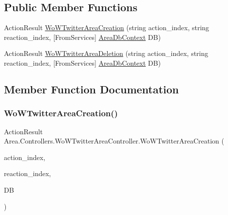 \subsection*{Public Member Functions}
\begin{DoxyCompactItemize}
\item 
Action\+Result \mbox{\hyperlink{classArea_1_1Controllers_1_1WoWTwitterAreaController_a5830d4d52fd06ba8eaf4a258a3047694}{Wo\+W\+Twitter\+Area\+Creation}} (string action\+\_\+index, string reaction\+\_\+index, \mbox{[}From\+Services\mbox{]} \mbox{\hyperlink{classArea_1_1DAT_1_1AreaDbContext}{Area\+Db\+Context}} DB)
\item 
Action\+Result \mbox{\hyperlink{classArea_1_1Controllers_1_1WoWTwitterAreaController_a5599b8a1304ec0e64221de7b100f1bc0}{Wo\+W\+Twitter\+Area\+Deletion}} (string action\+\_\+index, string reaction\+\_\+index, \mbox{[}From\+Services\mbox{]} \mbox{\hyperlink{classArea_1_1DAT_1_1AreaDbContext}{Area\+Db\+Context}} DB)
\end{DoxyCompactItemize}


\subsection{Member Function Documentation}
\mbox{\label{classArea_1_1Controllers_1_1WoWTwitterAreaController_a5830d4d52fd06ba8eaf4a258a3047694}} 
\subsubsection{\texorpdfstring{Wo\+W\+Twitter\+Area\+Creation()}{WoWTwitterAreaCreation()}}
{\footnotesize\ttfamily Action\+Result Area.\+Controllers.\+Wo\+W\+Twitter\+Area\+Controller.\+Wo\+W\+Twitter\+Area\+Creation (\begin{DoxyParamCaption}\item[{string}]{action\+\_\+index,  }\item[{string}]{reaction\+\_\+index,  }\item[{\mbox{[}\+From\+Services\mbox{]} \mbox{\hyperlink{classArea_1_1DAT_1_1AreaDbContext}{Area\+Db\+Context}}}]{DB }\end{DoxyParamCaption})\hspace{0.3cm}{\ttfamily [inline]}}

